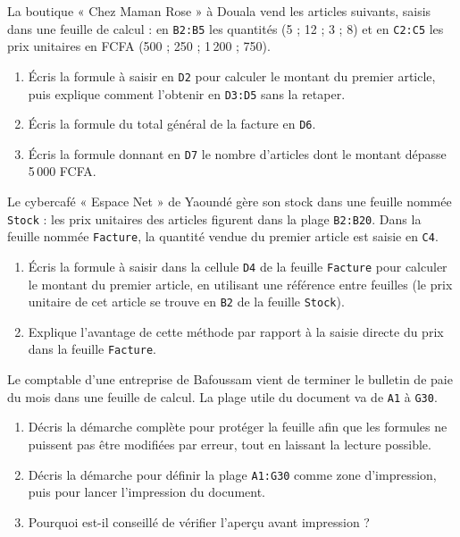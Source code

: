 \documentclass[11pt]{article}
\begin{document}
\begin{exercice}
La boutique « Chez Maman Rose » à Douala vend les articles suivants, saisis dans une feuille de calcul : en \texttt{B2:B5} les quantités (5 ; 12 ; 3 ; 8) et en \texttt{C2:C5} les prix unitaires en FCFA (500 ; 250 ; 1\,200 ; 750).
\begin{enumerate}
\item Écris la formule à saisir en \texttt{D2} pour calculer le montant du premier article, puis explique comment l'obtenir en \texttt{D3:D5} sans la retaper.
\item Écris la formule du total général de la facture en \texttt{D6}.
\item Écris la formule donnant en \texttt{D7} le nombre d'articles dont le montant dépasse 5\,000 FCFA.
\end{enumerate}
\end{exercice}

\begin{exercice}
Le cybercafé « Espace Net » de Yaoundé gère son stock dans une feuille nommée \texttt{Stock} : les prix unitaires des articles figurent dans la plage \texttt{B2:B20}. Dans la feuille nommée \texttt{Facture}, la quantité vendue du premier article est saisie en \texttt{C4}.
\begin{enumerate}
\item Écris la formule à saisir dans la cellule \texttt{D4} de la feuille \texttt{Facture} pour calculer le montant du premier article, en utilisant une référence entre feuilles (le prix unitaire de cet article se trouve en \texttt{B2} de la feuille \texttt{Stock}).
\item Explique l'avantage de cette méthode par rapport à la saisie directe du prix dans la feuille \texttt{Facture}.
\end{enumerate}
\end{exercice}

\begin{exercice}
Le comptable d'une entreprise de Bafoussam vient de terminer le bulletin de paie du mois dans une feuille de calcul. La plage utile du document va de \texttt{A1} à \texttt{G30}.
\begin{enumerate}
\item Décris la démarche complète pour protéger la feuille afin que les formules ne puissent pas être modifiées par erreur, tout en laissant la lecture possible.
\item Décris la démarche pour définir la plage \texttt{A1:G30} comme zone d'impression, puis pour lancer l'impression du document.
\item Pourquoi est-il conseillé de vérifier l'aperçu avant impression ?
\end{enumerate}
\end{exercice}
\end{document}
